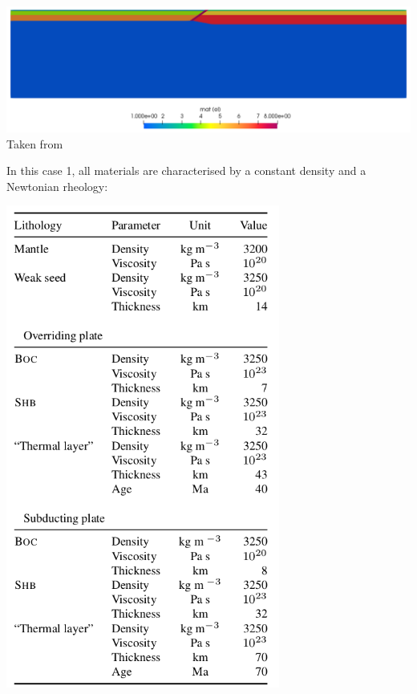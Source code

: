 \begin{center}
\includegraphics[width=\linewidth]{python_codes/fieldstone_62/results/mats1}\\
{\captionfont Taken from \cite{quin14}}
\end{center}

In this case 1, all materials are characterised by a constant density and a Newtonian rheology:
\begin{center}
\includegraphics[width=9cm]{python_codes/fieldstone_62/images/quin14_mats}
\end{center}

